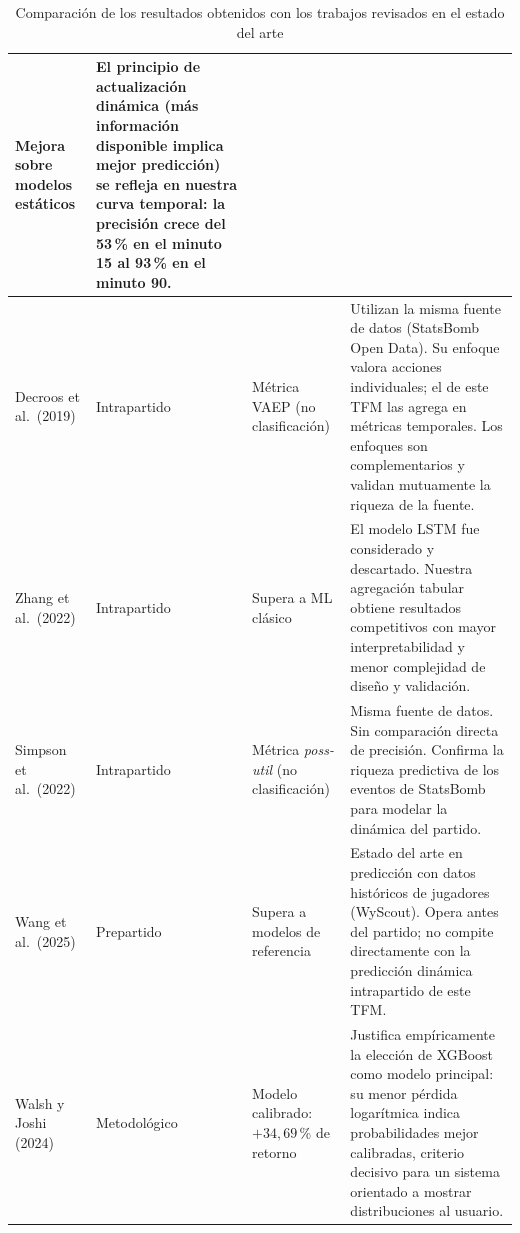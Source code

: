 \begin{table}[H]
\begin{tabularx}{\textwidth}{|p{2.8cm}|p{1.8cm}|p{2.2cm}|X|}
        Mejora sobre modelos estáticos                &
        El principio de actualización dinámica (más información disponible implica mejor predicción) se refleja en nuestra curva temporal: la precisión crece del 53\,\% en el minuto 15 al 93\,\% en el minuto 90.                    \\
        \hline
        Decroos et al.\ (2019)                        &
        Intrapartido                                  &
        Métrica VAEP (no clasificación)               &
        Utilizan la misma fuente de datos (StatsBomb Open Data). Su enfoque valora acciones individuales; el de este TFM las agrega en métricas temporales. Los enfoques son complementarios y validan mutuamente la riqueza de la fuente. \\
        \hline
        Zhang et al.\ (2022)                          &
        Intrapartido                                  &
        Supera a ML clásico                           &
        El modelo LSTM fue considerado y descartado. Nuestra agregación tabular obtiene resultados competitivos con mayor interpretabilidad y menor complejidad de diseño y validación.                                                \\
        \hline
        Simpson et al.\ (2022)                        &
        Intrapartido                                  &
        Métrica \textit{poss-util} (no clasificación) &
        Misma fuente de datos. Sin comparación directa de precisión. Confirma la riqueza predictiva de los eventos de StatsBomb para modelar la dinámica del partido.                                                                  \\
        \hline
        Wang et al.\ (2025)                           &
        Prepartido                                    &
        Supera a modelos de referencia                &
        Estado del arte en predicción con datos históricos de jugadores (WyScout). Opera antes del partido; no compite directamente con la predicción dinámica intrapartido de este TFM.                                               \\
        \hline
        Walsh y Joshi (2024)                          &
        Metodológico                                  &
        Modelo calibrado: $+34{,}69$\,\% de retorno   &
        Justifica empíricamente la elección de XGBoost como modelo principal: su menor pérdida logarítmica indica probabilidades mejor calibradas, criterio decisivo para un sistema orientado a mostrar distribuciones al usuario.    \\
        \hline
    \end{tabularx}
    \caption{Comparación de los resultados obtenidos con los trabajos revisados en el estado del arte}
    \label{tab:comparacion_soa}
\end{table}

